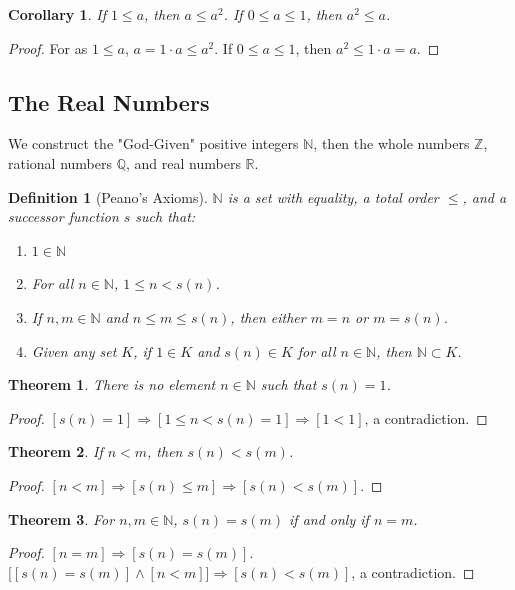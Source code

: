 \documentclass[oneside]{book}
\theoremstyle{mystyle}
\newtheorem{theorem}{Theorem}[section]
\newtheorem{definition}{Definition}[section]
\newtheorem{corollary}{Corollary}[section]
\begin{document}
\begin{corollary}
If $1\leq a$, then $a \leq a^2$. If $0\leq a \leq 1$, then $a^2 \leq a$.
\end{corollary}
\begin{proof}
For as $1\leq a$, $a=1\cdot a \leq a^2$. If $0\leq a \leq 1$, then $a^2 \leq 1\cdot a = a$.
\end{proof}
%
\subsection{The Real Numbers}
%
We construct the "God-Given" positive integers $\mathbb{N}$, then the whole numbers $\mathbb{Z}$, rational numbers $\mathbb{Q}$, and real numbers $\mathbb{R}$.

\begin{definition}[Peano's Axioms]
$\mathbb{N}$ is a set with equality, a total order $\leq$, and a successor function $s$ such that:
\begin{enumerate}
\item $1\in \mathbb{N}$
\item For all $n\in \mathbb{N}$, $1\leq n < s(n)$.
\item If $n,m\in \mathbb{N}$ and $n\leq m \leq s(n)$, then either $m=n$ or $m=s(n)$.
\item Given any set $K$, if $1\in K$ and $s(n)\in K$ for all $n\in \mathbb{N}$, then $\mathbb{N}\subset K$.
\end{enumerate}
\end{definition}

\begin{theorem}
There is no element $n\in \mathbb{N}$ such that $s(n) =1$.
\end{theorem}
\begin{proof}
$[s(n) = 1]\Rightarrow [1\leq n < s(n)=1]\Rightarrow[1<1]$, a contradiction.
\end{proof}

\begin{theorem}
If $n<m$, then $s(n)< s(m)$.
\end{theorem}
\begin{proof}
$[n<m]\Rightarrow [s(n)\leq m] \Rightarrow [s(n) < s(m)]$.
\end{proof}

\begin{theorem}
For $n,m\in \mathbb{N}$, $s(n)=s(m)$ if and only if $n=m$.
\end{theorem}
\begin{proof}
$[n=m]\Rightarrow [s(n)=s(m)]$. $\big[[s(n)=s(m)]\land [n<m]\big] \Rightarrow [s(n)<s(m)]$, a contradiction.
\end{proof}
\end{document}
